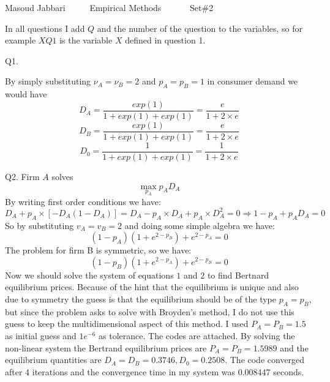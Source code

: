 \documentclass{report}
\begin{document}
\begin{Large}
\begin{center}
\Large{Masoud Jabbari \ \ \ \ \  Empirical Methods \ \ \ \ \ \ Set\#2}
\end{center}
\end{Large}

In all questions I add $Q$ and the number of the question to the variables, so for example $XQ1$ is the variable $X$ defined in question 1. 


Q1.

By simply substituting $\nu_A=\nu_B=2$ and $p_A=p_B=1$ in consumer demand we would have
\begin{equation*}
D_A=\frac{exp(1)}{1+exp(1)+exp(1)}=\frac{e}{1+2\times e}
\end{equation*}
\begin{equation*}
D_B=\frac{exp(1)}{1+exp(1)+exp(1)}=\frac{e}{1+2\times e}
\end{equation*}
\begin{equation*}
D_0=\frac{1}{1+exp(1)+exp(1)}=\frac{1}{1+2\times e}
\end{equation*}

Q2.
Firm $A$ solves
\begin{equation*}
\max_{p_{A}}p_{A}D_{A}
\end{equation*}
By writing first order conditions we have:
\begin{equation*}
D_{A}+p_{A}\times\left[-D_{A}\left(1-D_{A}\right)\right]=D_{A}-p_{A}\times D_{A}+p_{A}\times D_{A}^2=0\Rightarrow 1-p_{A}+p_{A}D_{A}=0 
\end{equation*}
So by substituting $v_{A}=v_{B}=2$ and doing some simple algebra we have:
\begin{equation}
\left(1-p_{A} \right)\left(1+e^{2-p_{B}}\right)+e^{2-p_{	A}}=0  
\end{equation}
The problem for firm B is symmetric, so we have:
\begin{equation}
\left(1-p_{B} \right)\left(1+e^{2-p_{A}}\right)+e^{2-p_{B}}=0  
\end{equation}
Now we should solve the system of equations $1$ and $2$ to find Bertnard equilibrium prices. Because of the hint that the equilibrium is unique and also due to symmetry the guess is that the equilibrium should be of the type $p_{A}=p_{B}$, but since the problem asks to solve with Broyden's method, I do not use this guess to keep the multidimensional aspect of this method. 
I used $P_{A}=P_{B}=1.5$ as initial guess and $1e^{-6}$ as tolerance. The codes are attached. By solving the non-linear system the Bertrand equilibrium prices are $P_{A}=P_{B}=1.5989$ and the equilibrium quantities are $D_{A}=D_{B}=0.3746, D_{0}=0.2508$. The code converged after 4 iterations and the convergence time in my system was 0.008447 seconds.
\end{document}
